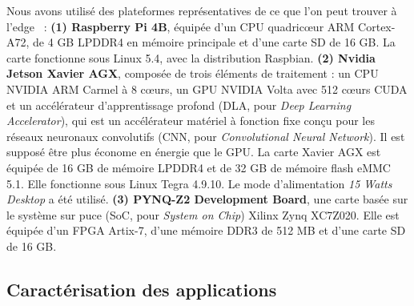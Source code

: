 Nous avons utilisé des plateformes représentatives de ce que l'on peut trouver à l'edge~\cite{slimani:hal-04159551, kljucaric2020} :
\textbf{(1) Raspberry Pi 4B}, équipée d'un CPU quadricœur ARM Cortex-A72, de 4 GB LPDDR4 en mémoire principale et d'une carte SD de 16 GB. La carte fonctionne sous Linux 5.4, avec la distribution Raspbian.
\textbf{(2) Nvidia Jetson Xavier AGX}, composée de trois éléments de traitement : un CPU NVIDIA ARM Carmel à 8 cœurs, un GPU NVIDIA Volta avec 512 cœurs CUDA et un accélérateur d'apprentissage profond (\gls{DLA}, pour \textit{Deep Learning Accelerator}), qui est un accélérateur matériel à fonction fixe conçu pour les réseaux neuronaux convolutifs (\gls{CNN}, pour \textit{Convolutional Neural Network}). Il est supposé être plus économe en énergie que le GPU. La carte Xavier AGX est équipée de 16 GB de mémoire LPDDR4 et de 32 GB de mémoire flash eMMC 5.1. Elle fonctionne sous Linux Tegra 4.9.10. Le mode d'alimentation \textit{15 Watts Desktop} a été utilisé.
\textbf{(3) PYNQ-Z2 Development Board}, une carte basée sur le système sur puce (\gls{SoC}, pour \textit{System on Chip}) Xilinx Zynq XC7Z020. Elle est équipée d'un FPGA Artix-7, d'une mémoire DDR3 de 512 MB et d'une carte SD de 16 GB.

\subsection{Caractérisation des applications}
\label{section:herocache-characterization-workloads}

